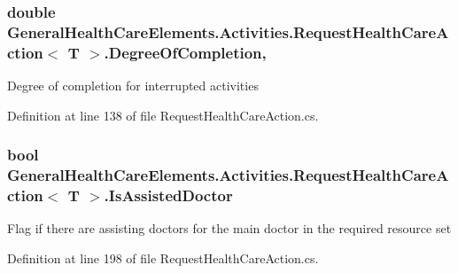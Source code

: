 \subsubsection[{\texorpdfstring{Degree\+Of\+Completion}{DegreeOfCompletion}}]{\setlength{\rightskip}{0pt plus 5cm}double {\bf General\+Health\+Care\+Elements.\+Activities.\+Request\+Health\+Care\+Action}$<$ T $>$.Degree\+Of\+Completion\hspace{0.3cm}{\ttfamily [get]}, {\ttfamily [set]}}\hypertarget{class_general_health_care_elements_1_1_activities_1_1_request_health_care_action_a7ec8958080f63e3217f2b34a17838f98}{}\label{class_general_health_care_elements_1_1_activities_1_1_request_health_care_action_a7ec8958080f63e3217f2b34a17838f98}


Degree of completion for interrupted activities 



Definition at line 138 of file Request\+Health\+Care\+Action.\+cs.

\subsubsection[{\texorpdfstring{Is\+Assisted\+Doctor}{IsAssistedDoctor}}]{\setlength{\rightskip}{0pt plus 5cm}bool {\bf General\+Health\+Care\+Elements.\+Activities.\+Request\+Health\+Care\+Action}$<$ T $>$.Is\+Assisted\+Doctor\hspace{0.3cm}{\ttfamily [get]}}\hypertarget{class_general_health_care_elements_1_1_activities_1_1_request_health_care_action_a5eca2ba4e69c62dedbbb71aa1989e2b1}{}\label{class_general_health_care_elements_1_1_activities_1_1_request_health_care_action_a5eca2ba4e69c62dedbbb71aa1989e2b1}


Flag if there are assisting doctors for the main doctor in the required resource set 



Definition at line 198 of file Request\+Health\+Care\+Action.\+cs.

